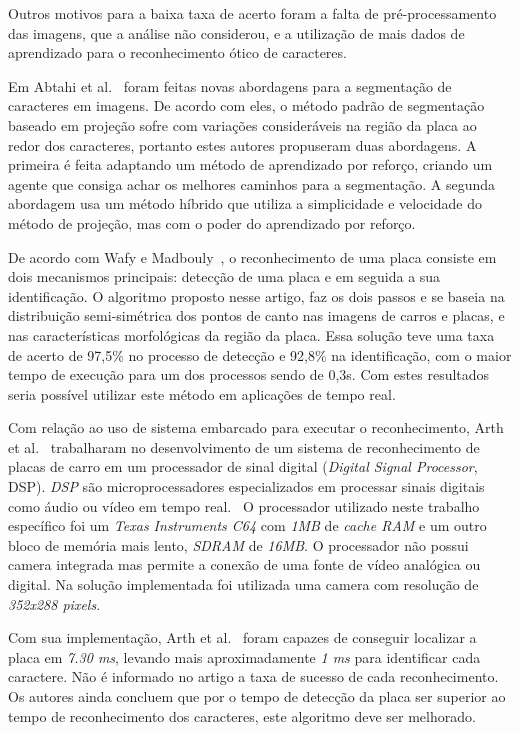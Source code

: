 Outros motivos para a baixa taxa de acerto foram a falta de pré-processamento
das imagens, que a análise não considerou, e a utilização de mais dados de
aprendizado para o reconhecimento ótico de caracteres.

Em Abtahi et al.~\cite{abtahi2015deep} foram feitas novas abordagens para a
segmentação de caracteres em imagens. De acordo com eles, o método padrão de
segmentação baseado em projeção sofre com variações consideráveis na região da
placa ao redor dos caracteres, portanto estes autores propuseram duas abordagens.
A primeira é feita adaptando um método de aprendizado por reforço, criando um agente que
consiga achar os melhores caminhos para a segmentação.  A segunda abordagem usa
um método híbrido que utiliza a simplicidade e velocidade do método de projeção,
mas com o poder do aprendizado por reforço.

De acordo com Wafy e Madbouly~\cite{wafy2016efficient}, o reconhecimento de uma
placa consiste em dois mecanismos principais: detecção de uma placa e em seguida
a sua identificação. O algoritmo proposto nesse artigo, faz os dois passos e se
baseia na distribuição semi-simétrica dos pontos de canto nas imagens de carros
e placas, e nas características morfológicas da região da placa. Essa solução
teve uma taxa de acerto de 97,5\% no processo de detecção e 92,8\% na
identificação, com o maior tempo de execução para um dos processos sendo de
0,3s. Com estes resultados seria possível utilizar este método em aplicações de
tempo real.

Com relação ao uso de sistema embarcado para executar o reconhecimento, Arth et
al.~\cite{arth2007real} trabalharam no desenvolvimento de um sistema de reconhecimento
de placas de carro em um processador de sinal digital (\emph{Digital Signal Processor}, DSP).
\emph{DSP} são microprocessadores especializados em
processar sinais digitais como áudio ou vídeo em tempo real.~\cite{yovits1993advances} O processador utilizado
neste trabalho específico foi um \emph{Texas Instruments C64} com \emph{1MB} de \emph{cache RAM} e um outro bloco
de memória mais lento, \emph{SDRAM} de \emph{16MB}. O processador não possui camera integrada mas permite a conexão de
uma fonte de vídeo analógica ou digital. Na solução implementada foi utilizada uma camera com resolução de \emph{352x288 pixels}.

Com sua implementação, Arth et al.~\cite{arth2007real} foram capazes de conseguir localizar a placa em
\emph{7.30 ms}, levando mais aproximadamente \emph{1 ms} para identificar cada caractere. Não é informado no artigo
a taxa de sucesso de cada reconhecimento. Os autores ainda concluem que por o tempo de detecção da placa ser superior
ao tempo de reconhecimento dos caracteres, este algoritmo deve ser melhorado.

